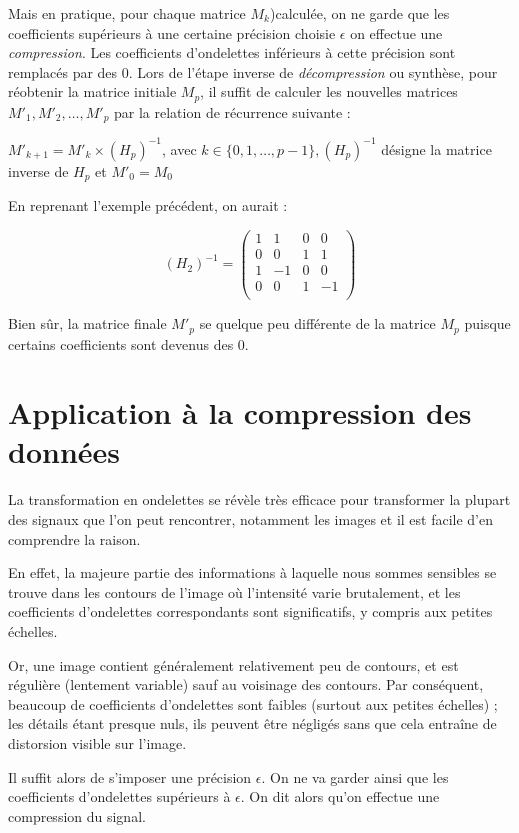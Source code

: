 \documentclass{article}
\begin{document}
Mais en pratique, pour chaque matrice $M_k$)calculée, on ne garde que les coefficients supérieurs à une certaine précision choisie $\epsilon$ on effectue une \emph{compression}. Les coefficients d’ondelettes inférieurs à cette précision sont remplacés par des 0.
Lors de l’étape inverse de \emph{décompression} ou synthèse, pour réobtenir la matrice initiale $M_p$, il suffit de calculer les nouvelles matrices $M'_1,M'_2,…,M'_p$ par la relation de récurrence suivante :

$M'_{k+1} = M'_{k} \times (H_{p})^{-1}$, avec $k \in \{0,1,\dots{},p-1\}, (H_p)^{-1}$ désigne la matrice inverse de $H_p$ et $M'_0 = M_0$


En reprenant l’exemple précédent, on aurait :

\[ (H_2)^{-1} = \begin{pmatrix}
1 & 1 & 0 & 0 \\
0 & 0 & 1 & 1 \\
1 & -1 & 0 & 0 \\
0 & 0 & 1 & -1 \\
\end{pmatrix} 
\]

Bien sûr, la matrice finale $M'_p$ se quelque peu différente de la matrice $M_p$ puisque certains coefficients sont devenus des 0.


\section{Application à la compression des données}

La transformation en ondelettes se révèle très efficace pour transformer la plupart des signaux que l'on peut rencontrer, notamment les images et il est facile d'en comprendre la raison. 

En effet, la majeure partie des informations à laquelle nous sommes sensibles se trouve dans les contours de l'image où l'intensité varie brutalement, et les coefficients d'ondelettes correspondants sont significatifs, y compris aux petites échelles. 

Or, une image contient généralement relativement peu de contours, et est régulière (lentement variable) sauf au voisinage des contours. Par conséquent, beaucoup de coefficients d'ondelettes sont faibles (surtout aux petites échelles) ; les détails étant presque nuls, ils peuvent être négligés sans que cela entraîne de distorsion visible sur l'image. 

Il suffit alors de s’imposer une précision $\epsilon$. On ne va garder ainsi que les coefficients d’ondelettes supérieurs à $\epsilon$. On dit alors qu’on effectue une compression du signal.
\end{document}
